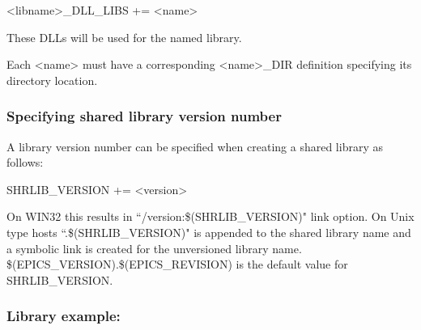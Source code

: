 \begin{description}\item \textless{}libname\textgreater{}\_DLL\_LIBS += \textless{}name\textgreater{}

\end{description}These DLLs will be used for the named library.

Each \textless{}name\textgreater{} must have a corresponding \textless{}name\textgreater{}\_DIR definition specifying its directory location.

\subsubsection{Specifying shared library version number}

A library version number can be specified when creating a shared library as follows:

\begin{description}\item {}SHRLIB\_VERSION += \textless{}version\textgreater{}

\end{description}On WIN32 this results in ``/version:\$(SHRLIB\_VERSION)" link option. On Unix type hosts ``.\$(SHRLIB\_VERSION)" is 
appended to the shared library name and a symbolic link is created for the unversioned library name. \\
\$(EPICS\_VERSION).\$(EPICS\_REVISION) is the default value for SHRLIB\_VERSION.

\subsubsection{Library example:}

